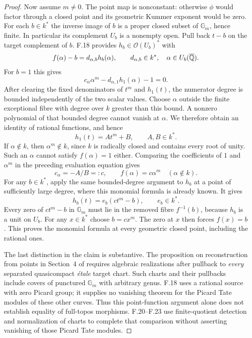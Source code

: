 \begin{proof}
Now assume $m\ne0$. The point map is nonconstant: otherwise
$\phi$ would factor through a closed point and its geometric
Kummer exponent would be zero. For each $b\in k^*$ the inverse
image of $b$ is a proper closed subset of $\mathbb G_m$, hence
finite. In particular its complement $U_b$ is a nonempty open.
Pull back $t-b$ on the target complement of $b$. F.18 provides
$h_b\in\mathcal O(U_b)^*$ with
\[
 f(\alpha)-b=d_{\alpha,b}h_b(\alpha),
 \qquad d_{\alpha,b}\in k^*,\quad \alpha\in U_b(\overline{\mathbb Q}).
\]
For $b=1$ this gives
\[
 c_\alpha\alpha^m-d_{\alpha,1}h_1(\alpha)-1=0.
\]
After clearing the fixed denominators of $t^m$ and $h_1(t)$,
the numerator degree is bounded independently of the two scalar
values. Choose $\alpha$ outside the finite exceptional fibre
with degree over $k$ greater than this bound. A nonzero polynomial
of that bounded degree cannot vanish at $\alpha$. We therefore
obtain an identity of rational functions, and hence
\[
 h_1(t)=A t^m+B,\qquad A,B\in k^*.
\]
If $\alpha\notin k$, then $\alpha^m\notin k$, since $k$ is
radically closed and contains every root of unity. Such an
$\alpha$ cannot satisfy $f(\alpha)=1$ either. Comparing the
coefficients of $1$ and $\alpha^m$ in the preceding evaluation
equation gives
\[
 c_\alpha=-A/B=:c,\qquad f(\alpha)=c\alpha^m
       \quad(\alpha\notin k).
\]
For any $b\in k^*$, apply the same bounded-degree argument to
$h_b$ at a point of sufficiently large degree, where this
monomial formula is already known. It gives
\[
 h_b(t)=e_b(c t^m-b),\qquad e_b\in k^*.
\]
Every zero of $c t^m-b$ in $\mathbb G_m$ must lie in the removed
fibre $f^{-1}(b)$, because $h_b$ is a unit on $U_b$. For any
$x\in k^*$ choose $b=cx^m$. The zero at $x$ then forces
$f(x)=b$. This proves the monomial formula at every geometric
closed point, including the rational ones.

The last distinction in the claim is substantive. The proposition
on reconstruction from points in Section~4 of
\citet{F_CHW2024} requires algebraic realizations after pullback
to \emph{every} separated quasicompact \emph{\'etale} target
chart. Such charts and their pullbacks include covers of punctured
$\mathbb G_m$ with arbitrary genus. F.18 uses a rational source
with zero Picard group; it supplies no vanishing theorem for the
Picard Tate modules of these other curves. Thus this point-function argument alone does not establish equality
of full-topos morphisms. F.20--F.23 use finite-quotient detection
and normalization of charts to complete that comparison without
asserting vanishing of those Picard Tate modules.
\end{proof}

